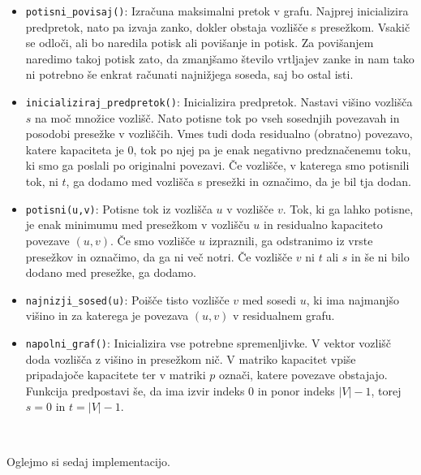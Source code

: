 \documentclass[mat1]{fmfdelo}
\begin{document}
\begin{itemize}
\item \texttt{potisni\_povisaj()}: Izračuna maksimalni pretok v grafu. Najprej inicializira predpretok, nato pa izvaja zanko, dokler obstaja vozlišče s presežkom. Vsakič se odloči, ali bo naredila potisk ali povišanje in potisk. Za povišanjem naredimo takoj potisk zato, da zmanjšamo število vrtljajev zanke in nam tako ni potrebno še enkrat računati najnižjega soseda, saj bo ostal isti.
\item \texttt{inicializiraj\_predpretok()}: Inicializira predpretok. Nastavi višino vozlišča $s$ na moč množice vozlišč. Nato potisne tok po vseh sosednjih povezavah in posodobi presežke v vozliščih. Vmes tudi doda residualno (obratno) povezavo, katere kapaciteta je $0$, tok po njej pa je enak negativno predznačenemu toku, ki smo ga poslali po originalni povezavi. Če vozlišče, v katerega smo potisnili tok, ni $t$, ga dodamo med vozlišča s presežki in označimo, da je bil tja dodan.
\item \texttt{potisni(u,v)}: Potisne tok iz vozlišča $u$ v vozlišče $v$. Tok, ki ga lahko potisne, je enak minimumu med presežkom v vozlišču $u$ in residualno kapaciteto povezave $(u,v)$. Če smo vozlišče $u$ izpraznili, ga odstranimo iz vrste presežkov in označimo, da ga ni več notri. Če vozlišče $v$ ni $t$ ali $s$ in še ni bilo dodano med presežke, ga dodamo.
\item \texttt{najnizji\_sosed(u)}: Poišče tisto vozlišče $v$ med sosedi $u$, ki ima najmanjšo višino in za katerega je povezava $(u,v)$ v residualnem grafu.
\item \texttt{napolni\_graf()}: Inicializira vse potrebne spremenljivke. V vektor vozlišč doda vozlišča z višino in presežkom nič. V matriko kapacitet vpiše pripadajoče kapacitete ter v matriki $p$ označi, katere povezave obstajajo. Funkcija predpostavi še, da ima izvir indeks $0$ in ponor indeks $|V| - 1$, torej $s = 0$ in $t = |V| - 1$.
\end{itemize}~

Oglejmo si sedaj implementacijo.
\end{document}
